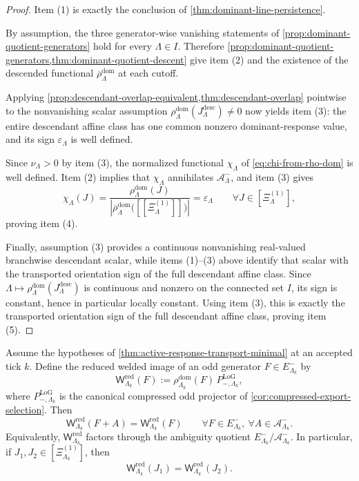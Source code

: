 \documentclass[11pt]{article}
\begin{document}
\begin{proof}
Item (1) is exactly the conclusion of \cref{thm:dominant-line-persistence}.

By assumption, the three generator-wise vanishing statements of
\cref{prop:dominant-quotient-generators} hold for every \(\Lambda\in I\).
Therefore \cref{prop:dominant-quotient-generators,thm:dominant-quotient-descent} give item (2)
and the existence of the descended functional
\(
\overline{\rho}^{\mathrm{dom}}_{\Lambda}
\)
at each cutoff.

Applying \cref{prop:descendant-overlap-equivalent,thm:descendant-overlap} pointwise to the
nonvanishing scalar assumption
\(
\rho^{\mathrm{dom}}_{\Lambda}(J^{\mathrm{desc}}_{\Lambda})\neq 0
\)
now yields
item (3): the entire descendant affine class has one common nonzero dominant-response value, and
its sign \(\varepsilon_{\Lambda}\) is well defined.

Since \(\nu_{\Lambda}>0\) by item (3), the normalized functional \(\chi_{\Lambda}\) of
\eqref{eq:chi-from-rho-dom} is well defined.
Item (2) implies that \(\chi_{\Lambda}\) annihilates \(\mathcal A^-_{\Lambda}\), and item (3)
gives
\[
\chi_{\Lambda}(J)
=
\frac{\rho^{\mathrm{dom}}_{\Lambda}(J)}{
\left|
\overline{\rho}^{\mathrm{dom}}_{\Lambda}\big([\![\Xi^{(1)}_{\Lambda}]\!]\big)
\right|
}
=
\varepsilon_{\Lambda}
\qquad
\forall J\in[\Xi^{(1)}_{\Lambda}],
\]
proving item (4).

Finally, assumption (3) provides a continuous nonvanishing real-valued branchwise descendant scalar,
while items (1)--(3) above identify that scalar with the transported orientation sign of the full
descendant affine class.
Since
\(
\Lambda\mapsto \rho^{\mathrm{dom}}_{\Lambda}(J^{\mathrm{desc}}_{\Lambda})
\)
is continuous and nonzero on the connected set \(I\), its sign is constant, hence in particular
locally constant.
Using item (3), this is exactly the transported orientation sign of the full descendant affine
class, proving item (5).
\end{proof}

\begin{proposition}
\label{prop:reduced-welded-ambiguity-trivial}
Assume the hypotheses of \cref{thm:active-response-transport-minimal} at an accepted tick \(k\).
Define the reduced welded image of an odd generator \(F\in E^-_{\Lambda_k}\) by
\[
\mathsf W^{\mathrm{red}}_{\Lambda_k}(F)
:=
\rho^{\mathrm{dom}}_{\Lambda_k}(F)\,P_{-,\Lambda_k}^{\mathrm{LoG}},
\]
where \(P_{-,\Lambda_k}^{\mathrm{LoG}}\) is the canonical compressed odd projector of
\cref{cor:compressed-export-selection}.
Then
\[
\mathsf W^{\mathrm{red}}_{\Lambda_k}(F+A)
=
\mathsf W^{\mathrm{red}}_{\Lambda_k}(F)
\qquad
\forall F\in E^-_{\Lambda_k},\ \forall A\in\mathcal A^-_{\Lambda_k}.
\]
Equivalently, \(\mathsf W^{\mathrm{red}}_{\Lambda_k}\) factors through the ambiguity quotient
\(E^-_{\Lambda_k}/\mathcal A^-_{\Lambda_k}\).
In particular, if \(J_1,J_2\in[\Xi^{(1)}_{\Lambda_k}]\), then
\[
\mathsf W^{\mathrm{red}}_{\Lambda_k}(J_1)
=
\mathsf W^{\mathrm{red}}_{\Lambda_k}(J_2).
\]
\end{proposition}
\end{document}
